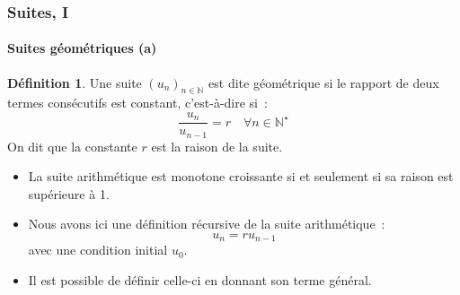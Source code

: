 \documentclass[10pt,notheorems]{beamer}
\theoremstyle{plain}
\theoremstyle{definition} %
\newtheorem{definition}{Définition}
\begin{document}
\begin{frame}
  \frametitle{Suites, I}
  \framesubtitle{Suites géométriques (a)}
  \hypertarget{slide_suites_geometrique_1}{}

  \bigskip

  \begin{definition}
    Une suite $(u_n)_{n\in\mathbb N}$ est dite géométrique si le rapport de deux termes consécutifs est constant, c'est-à-dire si~:
    \[
      \frac{u_n}{u_{n-1}} = r\quad \forall n\in\mathbb N^{\star}
    \]
    On dit que la constante $r$ est la raison de la suite.
  \end{definition}

  \bigskip

  \begin{itemize}

  \item La suite arithmétique est monotone croissante si et seulement si sa raison est supérieure à 1.\newline

  \item Nous avons ici une définition récursive de la suite arithmétique~:
    \[
      u_n = r u_{n-1}
    \]
    avec une condition initial $u_0$.\newline

  \item Il est possible de définir celle-ci en donnant son terme général.\newline

  \end{itemize}

\end{frame}
\end{document}
